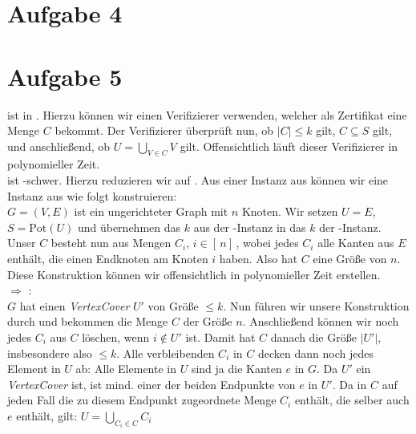 \documentclass[a4paper,11pt]{scrartcl}
\begin{document}
	\section*{Aufgabe 4}
	
	\section*{Aufgabe 5}

	 ist in . Hierzu können wir einen Verifizierer verwenden, welcher als Zertifikat eine Menge $C$ bekommt. Der Verifizierer überprüft nun, ob $\vert C \vert \leq k$ gilt, $C \subseteq S$ gilt, und anschließend, ob $U = \bigcup_{V \in C} V$ gilt. Offensichtlich läuft dieser Verifizierer in polynomieller Zeit.\\
	
	 ist -schwer. Hierzu reduzieren wir  auf . Aus einer Instanz aus  können wir eine Instanz aus  wie folgt konstruieren:\\
	$G=(V,E)$ ist ein ungerichteter Graph mit $n$ Knoten. Wir setzen $U = E$, $S = \text{Pot}(U)$ und übernehmen das $k$ aus der -Instanz in das $k$ der -Instanz. Unser $C$ besteht nun aus Mengen $C_i$, $i \in [\, n ]\,$, wobei jedes $C_i$ alle Kanten aus $E$ enthält, die einen Endknoten am Knoten $i$ haben. Also hat $C$ eine Größe von $n$. Diese Konstruktion können wir offensichtlich in polynomieller Zeit erstellen.\\
	
	 $\Rightarrow$ :\\
	$G$ hat einen \textit{VertexCover} $U'$ von Größe $\leq k$. Nun führen wir unsere Konstruktion durch und bekommen die Menge $C$ der Größe $n$. Anschließend können wir noch jedes $C_i$ aus $C$ löschen, wenn $i \not\in U'$ ist. Damit hat $C$ danach die Größe $\vert U' \vert$, insbesondere also $\leq k$. Alle verbleibenden $C_i$ in $C$ decken dann noch jedes Element in $U$ ab: Alle Elemente in $U$ sind ja die Kanten $e$ in $G$. Da $U'$ ein \textit{VertexCover} ist, ist mind. einer der beiden Endpunkte von $e$ in $U'$. Da in $C$ auf jeden Fall die zu diesem Endpunkt zugeordnete Menge $C_i$ enthält, die selber auch $e$ enthält, gilt: $U = \bigcup_{C_i \in C} C_i$\\
	
\end{document}
